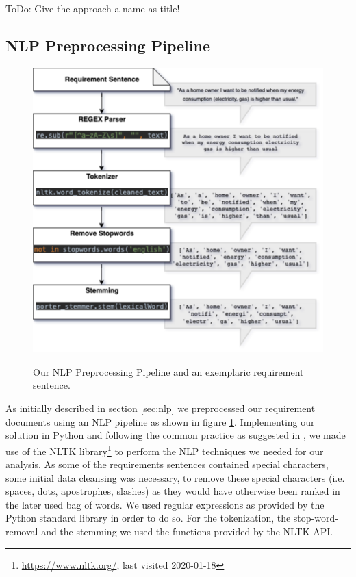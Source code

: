 \colorbox{yellow!30}{ToDo:} Give the approach a name as title!

\subsection{NLP Preprocessing Pipeline} %
\label{sub:own_pipeline}

\begin{figure}[ht]
  \caption{Our NLP Preprocessing Pipeline and an exemplaric requirement sentence.}
  \centering
    \includegraphics[width=\textwidth]{figures/NLP Pipeline.png}
    \label{fig:nlp_pipeline}
\end{figure}

As initially described in section \ref{sec:nlp} we preprocessed our requirement documents using an NLP pipeline as shown in figure \ref{fig:nlp_pipeline}. Implementing our solution in Python and following the common practice as suggested in \cite{ferrari_natural_2018}, we made use of the NLTK library\footnote{\url{https://www.nltk.org/}, last visited 2020-01-18} to perform the NLP techniques we needed for our analysis. As some of the requirements sentences contained special characters, some initial data cleansing was necessary, to remove these special characters (i.e. spaces, dots, apostrophes, slashes) as they would have otherwise been ranked in the later used bag of words. We used regular expressions as provided by the Python standard library in order to do so. For the tokenization, the stop-word-removal and the stemming we used the functions provided by the NLTK API.

